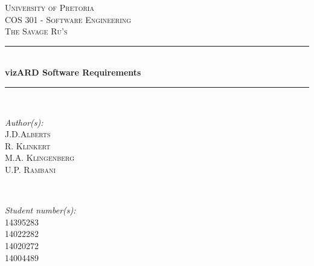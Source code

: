 \documentclass[a4paper,12pt]{article}
\begin{document}
\begin{titlepage}

\newcommand{\HRule}{\rule{\linewidth}{0.5mm}} %

\center %
 

\textsc{\LARGE University of Pretoria}\\[1.5cm]
\textsc{\Large COS 301 - Software Engineering}\\[0.5cm]
\textsc{\large The Savage Ru's}\\[0.5cm]


\HRule \\[0.4cm]
{ \huge \bfseries vizARD Software Requirements}\\[0.4cm] %
\HRule \\[1.5cm]
 

\begin{minipage}{0.4\textwidth}
\begin{flushleft} \large
\emph{Author(s):}\\
J.D.\textsc{Alberts}\\ %
R. \textsc{Klinkert}\\
M.A. \textsc{Klingenberg}\\
U.P. \textsc{Rambani}\\
\end{flushleft}
\end{minipage}
~
\begin{minipage}{0.4\textwidth}
\begin{flushright} \large
\emph{Student number(s):} \\
14395283\\ %
14022282\\
14020272\\
14004489\\
\end{flushright}
\end{minipage}\\[4cm]



\end{titlepage}
\end{document}
